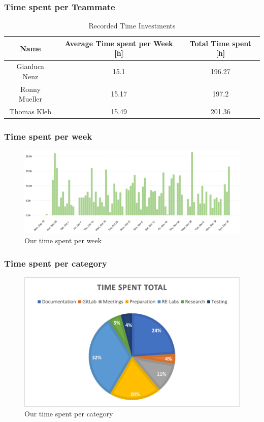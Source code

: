 \subsubsection*{Time spent per Teammate}
\begin{table}[H]
    \centering
    \begin{tabular}{||c c c||} 
        \hline
        Name & Average Time spent per Week [h] & Total Time spent [h]\\ [0.5ex] 
        \hline\hline
        Gianluca Nenz & 15.1 & 196.27 \\ 
        \hline
        Ronny Mueller & 15.17 & 197.2 \\
        \hline
        Thomas Kleb & 15.49 & 201.36 \\ 
        \hline
    \end{tabular}
    \caption{Recorded Time Investments}
    \label{time_ects_recorded}
\end{table}

\subsubsection*{Time spent per week}
\begin{figure}[H]
    \includegraphics[width=\linewidth, center]{resources/time-per-week.png}
    \caption{Our time spent per week}
    \label{fig:timeperweek}
\end{figure}

\subsubsection*{Time spent per category}
\begin{figure}[H]
    \includegraphics[width=\linewidth, center]{resources/time-per-category.png}
    \caption{Our time spent per category}
    \label{fig:timepercategory}
\end{figure}



